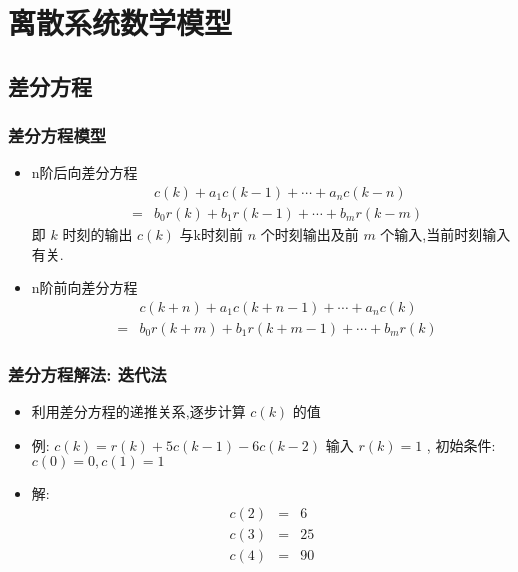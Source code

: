\documentclass[table]{article}
\begin{document}
\section{离散系统数学模型}
\label{sec-4}
\subsection{差分方程}
\label{sec-4-1}
\begin{frame}
\frametitle{差分方程模型}
\label{sec-4-1-1}

\begin{itemize}
\item <2->n阶后向差分方程
      \begin{eqnarray*}
       & &c(k)+a_1 c(k-1)+\cdots+a_n c(k-n) \\
       &=& b_0 r(k) +b_1 r(k-1) + \cdots + b_m r(k-m)
      \end{eqnarray*}
      即  $k$  时刻的输出  $c(k)$  与k时刻前  $n$  个时刻输出及前  $m$  个输入,当前时刻输入有关.
\item <3->n阶前向差分方程
      \begin{eqnarray*}
    & &  c(k+n)+a_1 c(k+n-1)+\cdots+a_n c(k) \\
    &=& b_0 r(k+m)+b_1 r(k+m-1)+\cdots+ b_m r(k)
      \end{eqnarray*}
\end{itemize}
\end{frame}
\begin{frame}
\frametitle{差分方程解法: 迭代法}
\label{sec-4-1-2}

\begin{itemize}
\item 利用差分方程的递推关系,逐步计算  $c(k)$  的值
\item <2->例:  $c(k)=r(k)+5 c(k-1) -6 c(k-2)$  输入  $r(k)=1$ , 初始条件:  $c(0)=0,c(1)=1$
\item <3->解:
      \begin{eqnarray*}
      c(2) & = & 6\\
      c(3) & =& 25 \\
      c(4) &=& 90
      \end{eqnarray*}
\end{itemize}
\end{frame}
\end{document}
